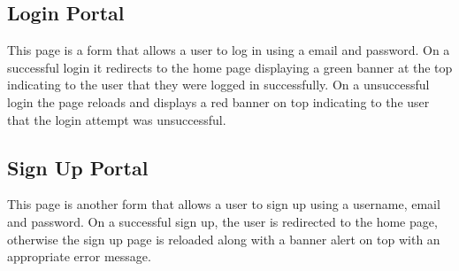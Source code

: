 \subsection{Login Portal}
This page is a form that allows a user to log in using a email and password. On a successful login it redirects to the home page displaying a green banner at the top indicating to the user that they were logged in successfully. On a unsuccessful login the page reloads and displays a red banner on top indicating to the user that the login attempt was unsuccessful.
\subsection{Sign Up Portal}
This page is another form that allows a user to sign up using a username, email and password. On a successful sign up, the user is redirected to the home page, otherwise the sign up page is reloaded along with a banner alert on top with an appropriate error message.
